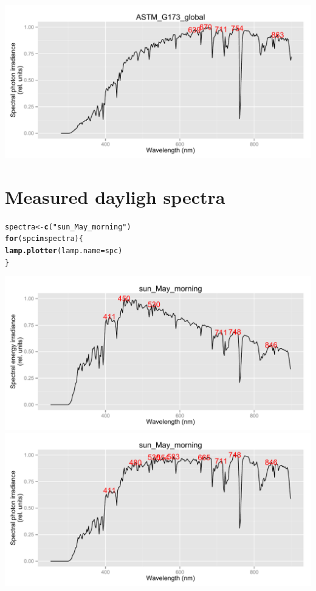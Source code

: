 \documentclass{article}\usepackage[]{graphicx}\usepackage[]{color}
\makeatletter
\newcommand{\hlstr}[1]{\textcolor[rgb]{0.192,0.494,0.8}{#1}}%
\newcommand{\hlstd}[1]{\textcolor[rgb]{0.345,0.345,0.345}{#1}}%
\newcommand{\hlkwa}[1]{\textcolor[rgb]{0.161,0.373,0.58}{\textbf{#1}}}%
\newcommand{\hlkwb}[1]{\textcolor[rgb]{0.69,0.353,0.396}{#1}}%
\newcommand{\hlkwc}[1]{\textcolor[rgb]{0.333,0.667,0.333}{#1}}%
\newcommand{\hlkwd}[1]{\textcolor[rgb]{0.737,0.353,0.396}{\textbf{#1}}}%
\newenvironment{kframe}{%
 \def\at@end@of@kframe{}%
 \ifinner\ifhmode%
  \def\at@end@of@kframe{\end{minipage}}%
  \begin{minipage}{\columnwidth}%
 \fi\fi%
 \def\FrameCommand##1{\hskip\@totalleftmargin \hskip-\fboxsep
 \colorbox{shadecolor}{##1}\hskip-\fboxsep
     \hskip-\linewidth \hskip-\@totalleftmargin \hskip\columnwidth}%
 \MakeFramed {\advance\hsize-\width
   \@totalleftmargin\z@ \linewidth\hsize
   \@setminipage}}%
 {\par\unskip\endMakeFramed%
 \at@end@of@kframe}
\newenvironment{knitrout}{}{} %
\makeatother
\begin{document}
\begin{knitrout}
{\includegraphics[width=.95\textwidth]{figure/pos-terrestrial-std4} 

}



\end{knitrout}


\section{Measured dayligh spectra}

\begin{knitrout}\footnotesize
{}\color{fgcolor}\begin{kframe}
\begin{alltt}
\hlstd{spectra} \hlkwb{<-} \hlkwd{c}\hlstd{(}\hlstr{"sun_May_morning"}\hlstd{)}
\hlkwa{for} \hlstd{(spc} \hlkwa{in} \hlstd{spectra) \{}
    \hlkwd{lamp.plotter}\hlstd{(}\hlkwc{lamp.name} \hlstd{= spc)}
\hlstd{\}}
\end{alltt}
\end{kframe}

{\centering \includegraphics[width=.95\textwidth]{figure/pos-terrestrial-meas1} 
\includegraphics[width=.95\textwidth]{figure/pos-terrestrial-meas2} 

}



\end{knitrout}
\end{document}
